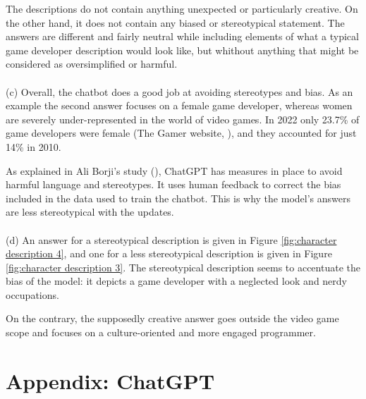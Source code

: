 \documentclass[a4paper]{article}
\begin{document}
The descriptions do not contain anything unexpected or particularly creative. On the other hand, it does not contain any biased or stereotypical statement.
The answers are different and fairly neutral while including elements of what a typical game developer description would look like, but whithout anything that might be considered as oversimplified or harmful.\\
\\
(c) Overall, the chatbot does a good job at avoiding stereotypes and bias.
As an example the second answer focuses on a female game developer, whereas women are severely under-represented in the world of video games.
In 2022 only 23.7\% of game developers were female (The Gamer website, \cite{TheGamer:2022}), and they accounted for just 14\% in 2010.

As explained in Ali Borji's study (\cite{Borji:2023}), ChatGPT has measures in place to avoid harmful language and stereotypes.
It uses human feedback to correct the bias included in the data used to train the chatbot. This is why the model's answers are less stereotypical with the updates.
\\
\\
(d) An answer for a stereotypical description is given in Figure \ref{fig:character description 4}, and one for a less stereotypical description is given in Figure \ref{fig:character description 3}.
The stereotypical description seems to accentuate the bias of the model: it depicts a game developer with a neglected look and nerdy occupations.

On the contrary, the supposedly creative answer goes outside the video game scope and focuses on a culture-oriented and more engaged programmer.

\section*{Appendix: ChatGPT}
\end{document}
